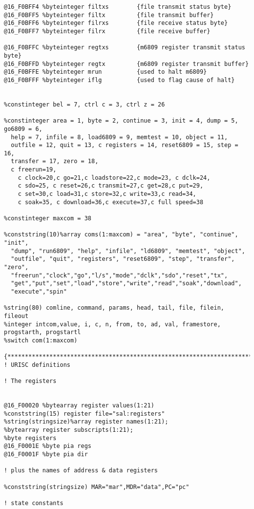 \begin{verbatim}
@16_F0BFF4 %byteinteger filtxs        {file transmit status byte}
@16_F0BFF5 %byteinteger filtx         {file transmit buffer}
@16_F0BFF6 %byteinteger filrxs        {file receive status byte}
@16_F0BFF7 %byteinteger filrx         {file receive buffer}

@16_F0BFFC %byteinteger regtxs        {m6809 register transmit status byte}
@16_F0BFFD %byteinteger regtx         {m6809 register transmit buffer}
@16_F0BFFE %byteinteger mrun          {used to halt m6809}
@16_F0BFFF %byteinteger iflg          {used to flag cause of halt}


%constinteger bel = 7, ctrl c = 3, ctrl z = 26

%constinteger area = 1, byte = 2, continue = 3, init = 4, dump = 5, go6809 = 6,
  help = 7, infile = 8, load6809 = 9, memtest = 10, object = 11,
  outfile = 12, quit = 13, c registers = 14, reset6809 = 15, step = 16,
  transfer = 17, zero = 18,
  c freerun=19,
    c clock=20,c go=21,c loadstore=22,c mode=23, c dclk=24,
    c sdo=25, c reset=26,c transmit=27,c get=28,c put=29,
    c set=30,c load=31,c store=32,c write=33,c read=34,
    c soak=35, c download=36,c execute=37,c full speed=38

%constinteger maxcom = 38

%conststring(10)%array coms(1:maxcom) = "area", "byte", "continue", "init",
  "dump", "run6809", "help", "infile", "ld6809", "memtest", "object",
  "outfile", "quit", "registers", "reset6809", "step", "transfer", "zero",
  "freerun","clock","go","l/s","mode","dclk","sdo","reset","tx",
  "get","put","set","load","store","write","read","soak","download",
  "execute","spin"

%string(80) comline, command, params, head, tail, file, filein, fileout
%integer intcom,value, i, c, n, from, to, ad, val, framestore, progstarth, progstartl
%switch com(1:maxcom)

{***********************************************************************}
! URISC definitions

! The registers


@16_F00020 %bytearray register values(1:21)
%conststring(15) register file="sal:registers"
%string(stringsize)%array register names(1:21);
%bytearray register subscripts(1:21);
%byte registers
@16_F0001E %byte pia regs
@16_F0001F %byte pia dir

! plus the names of address & data registers

%conststring(stringsize) MAR="mar",MDR="data",PC="pc"

! state constants


\end{verbatim}
